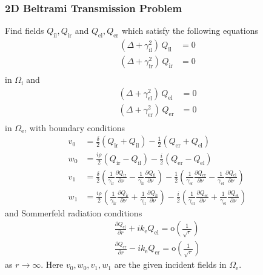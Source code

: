 \subsubsection{2D Beltrami Transmission Problem}

Find fields $Q_\text{il}, Q_\text{ir}$ and $Q_\text{el}, Q_\text{er}$ which satisfy the following equations
\begin{equation}
\begin{split}
  (\Delta + \gamma_\text{il}^2)\,Q_\text{il} &= 0 \\ 
  (\Delta + \gamma_\text{ir}^2)\,Q_\text{ir} &= 0 \\ 
\end{split}
\end{equation}
in $\Omega_\text{i}$ and
\begin{equation}
\begin{split}
  (\Delta + \gamma_\text{el}^2)\,Q_\text{el} &= 0 \\ 
  (\Delta + \gamma_\text{er}^2)\,Q_\text{er} &= 0 \\ 
\end{split}
\end{equation}
in $\Omega_\text{e}$, with boundary conditions
\begin{equation}
\begin{split}
  v_0 &= \frac{\delta}{2}(Q_\text{ir} + Q_\text{il}) - \frac{1}{2}(Q_\text{er} + Q_\text{el}) \\
  w_0 &= \frac{i\rho}{2}(Q_\text{ir} - Q_\text{il}) -\frac{i}{2}(Q_\text{er} - Q_\text{el}) \\
  v_1 &=\frac{\delta}{2}\left(\frac{1}{\gamma_\text{ir}}\frac{\partial Q_\text{ir}}{\partial\nu} - \frac{1}{\gamma_\text{il}}\frac{\partial Q_\text{il}}{\partial\nu}\right) -\frac{1}{2}\left(\frac{1}{\gamma_\text{er}}\frac{\partial Q_\text{er}}{\partial\nu} - \frac{1}{\gamma_\text{el}}\frac{\partial Q_\text{el}}{\partial\nu}\right) \\
  w_1 &=\frac{i\rho}{2}\left(\frac{1}{\gamma_\text{ir}}\frac{\partial Q_\text{ir}}{\partial\nu} + \frac{1}{\gamma_\text{il}}\frac{\partial Q_\text{il}}{\partial\nu}\right) -\frac{i}{2}\left(\frac{1}{\gamma_\text{er}}\frac{\partial Q_\text{er}}{\partial\nu} + \frac{1}{\gamma_\text{el}}\frac{\partial Q_\text{el}}{\partial\nu}\right) 
\end{split}
\end{equation}
and Sommerfeld radiation conditions
\begin{align}
  \frac{\partial Q_\text{el}}{\partial r}+ik_\text{e}Q_\text{el} = \text{o}\left(\frac{1}{\sqrt{r}}\right) \\
  \frac{\partial Q_\text{er}}{\partial r}-ik_\text{e}Q_\text{er} = \text{o}\left(\frac{1}{\sqrt{r}}\right) 
\end{align}
as $r\to\infty$. Here $v_0, w_0, v_1, w_1$ are the given incident fields in $\Omega_\text{e}$.

